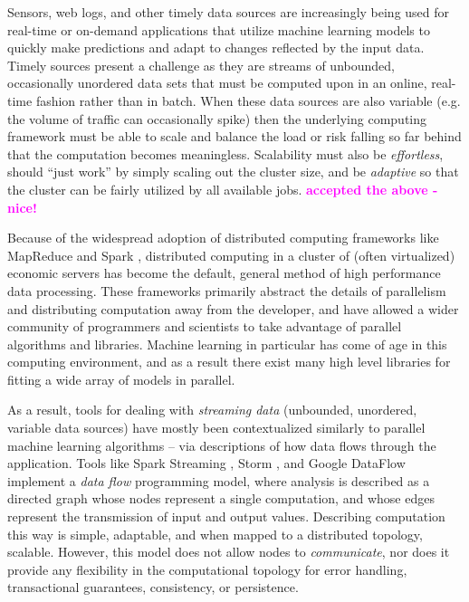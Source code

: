 \documentclass[conference,twocolumn,11pt]{IEEEtran}
\newcommand{\bennote}[1]{\textcolor{magenta}{\bf #1}}
\begin{document}
Sensors, web logs, and other timely data sources are increasingly being used for  real-time or on-demand applications that utilize machine learning models to quickly make predictions and adapt to changes reflected by the input data. Timely sources present a challenge as they are streams of unbounded, occasionally unordered data sets that must be computed upon in an online, real-time fashion rather than in batch. When these data sources are also variable (e.g. the volume of traffic can occasionally spike) then the underlying computing framework must be able to scale and balance the load or risk falling so far behind that the computation becomes meaningless. Scalability must also be \textit{effortless}, should ``just work'' by simply scaling out the cluster size, and be \textit{adaptive} so that the cluster can be fairly utilized by all available jobs. \bennote{accepted the above - nice!}

Because of the widespread adoption of distributed computing frameworks like MapReduce \cite{dean_mapreduce:_2008} and Spark \cite{zaharia_resilient_2012}, distributed computing in a cluster of (often virtualized) economic servers has become the default, general method of high performance data processing. These frameworks primarily abstract the details of parallelism and distributing computation away from the developer, and have allowed a wider community of programmers and scientists to take advantage of parallel algorithms and libraries. Machine learning in particular has come of age in this computing environment, and as a result there exist many high level libraries for fitting a wide array of models in parallel.

As a result, tools for dealing with \textit{streaming data} (unbounded, unordered, variable data sources) have mostly been contextualized similarly to parallel machine learning algorithms -- via descriptions of how data flows through the application. Tools like Spark Streaming \cite{zaharia_discretized_2012}, Storm \cite{toshniwal_storm_2014}, and Google DataFlow \cite{akidau_dataflow_2015} implement a \textit{data flow} programming model, where analysis is described as a directed graph whose nodes represent a single computation, and whose edges represent the transmission of input and output values. Describing computation this way is simple, adaptable, and when mapped to a distributed topology, scalable. However, this model does not allow nodes to \textit{communicate}, nor does it provide any flexibility in the computational topology for error handling, transactional guarantees, consistency, or persistence.
\end{document}
